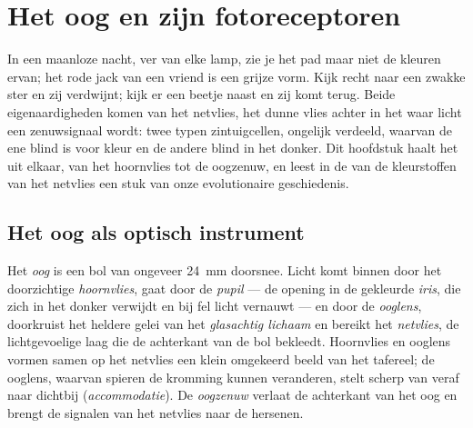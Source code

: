 \chapter{Het oog en zijn fotoreceptoren}\label{ch:g11:the-eye}

In een maanloze nacht, ver van elke lamp, zie je het pad maar niet de
kleuren ervan; het rode jack van een vriend is een grijze vorm. Kijk recht
naar een zwakke ster en zij verdwijnt; kijk er een beetje naast en zij
komt terug. Beide eigenaardigheden komen van het netvlies, het dunne vlies
achter in het  waar licht een zenuwsignaal wordt: twee typen
zintuigcellen, ongelijk verdeeld, waarvan de ene blind is voor kleur en de
andere blind in het donker. Dit hoofdstuk haalt het  uit elkaar, van
het hoornvlies tot de oogzenuw, en leest in de  van de kleurstoffen
van het netvlies een stuk van onze evolutionaire geschiedenis.

\section{Het oog als optisch instrument}

\begin{definition}\label{def:g11:the-eye:parts}
Het \emph{oog} is een bol van ongeveer \qty{24}{mm} doorsnee.
Licht komt binnen door het doorzichtige \emph{hoornvlies}, gaat door de
\emph{pupil} --- de opening in de gekleurde \emph{iris}, die zich in het
donker verwijdt en bij fel licht vernauwt --- en door de \emph{ooglens},
doorkruist het heldere gelei van het \emph{glasachtig lichaam} en bereikt
het \emph{netvlies}, de lichtgevoelige laag die de achterkant van de bol
bekleedt. Hoornvlies en ooglens vormen samen op het netvlies een klein
omgekeerd beeld van het tafereel; de ooglens, waarvan spieren de kromming
kunnen veranderen, stelt scherp van veraf naar dichtbij
(\emph{accommodatie}). De \emph{oogzenuw} verlaat de achterkant van het
oog en brengt de signalen van het netvlies naar de hersenen.
\end{definition}

